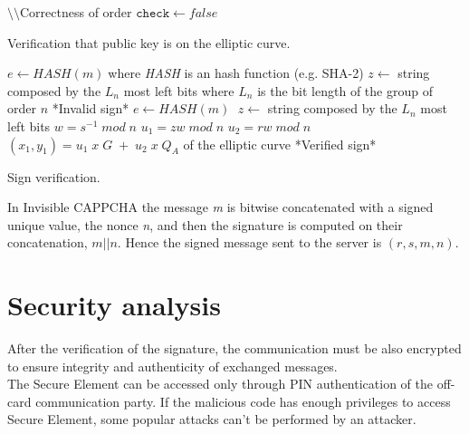 \begin{itemize}
{\begin{algorithm}[h]
{}
\BlankLine
$\setminus\setminus$Correctness of order\;
{	
$\mathtt{check}\gets false$\;
}
\caption{Verification that public key is on the elliptic curve.}\label{inv:ECDSA_key_verify}
\end{algorithm}
\begin{algorithm}[h]
\DontPrintSemicolon\footnotesize
{}
\BlankLine
$e\gets HASH(m)\;$where \textit{HASH} is an hash function (e.g. SHA-2)\;
\BlankLine
$z \gets$ string composed by the $L_n$ most left bits\;
where $L_n$ is the bit length of the group of order $n$\;
\BlankLine
{}
{*Invalid sign*}
$e\gets HASH(m)\;$\;
\BlankLine$z \gets$ string composed by the $L_n$ most left bits\;
$w=s^{-1}\; mod\; n$\;
\BlankLine
$u_1 =zw\; mod\; n$\;
$u_2 =rw\; mod\; n$\;
$(x_1, y_1)=u_1\; x\; G\;+\; u_2\; x\; Q_{A}$ of the elliptic curve\;
\BlankLine
{}
{*Verified sign*}
\BlankLine
\caption{Sign verification.}\label{inv:ECDSA_verify}
\end{algorithm}
}
\end{itemize}
In Invisible CAPPCHA the message \textit{m} is bitwise concatenated with a signed unique value, the nonce \textit{n}, and then the signature is computed on their concatenation, $m||n$. Hence the signed message sent to the server is $(r, s, m, n)$.

\section{Security analysis}
After the verification of the signature, the communication must be also encrypted to ensure integrity and authenticity of exchanged messages.\\
The Secure Element can be accessed only through PIN authentication of the off-card communication party. If the malicious code has enough privileges to access Secure Element, some popular attacks can't be performed by an attacker.\\

